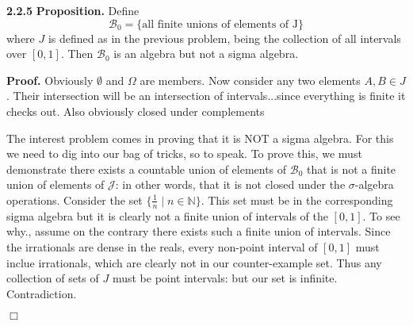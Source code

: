 \documentclass{article}
\begin{document}
\noindent \textbf{2.2.5} \textbf{Proposition.} Define \[\mathcal{B}_0 = \{\text{all finite unions of elements of J}\}\] where $J$ is defined as in the previous problem, being the collection of all intervals over $[0,1]$. Then $\mathcal{B}_0$ is an algebra but not a sigma algebra.

\medskip

\noindent \textbf{Proof.} Obviously $\emptyset$ and $\Omega$ are members. Now consider any two elements $A, B \in J$. Their intersection will be an intersection of intervals...since everything is finite it checks out. Also obviously closed under complements

The interest problem comes in proving that it is NOT a sigma algebra. For this we need to dig into our bag of tricks, so to speak. To prove this, we must demonstrate there exists a countable union of elements of $\mathcal{B}_0$ that is not a finite union of elements of $\mathcal{J}$: in other words, that it is not closed under the $\sigma$-algebra operations. Consider the set $\{ \frac{1}{n} \mid n \in \mathbb{N} \}$. This set must be in the corresponding sigma algebra but it is clearly not a finite union of intervals of the $[0,1]$. To see why., assume on the contrary there exists such a finite union of intervals. Since the irrationals are dense in the reals, every non-point interval of $[0,1]$ must inclue irrationals, which are clearly not in our counter-example set. Thus any collection of sets of $J$ must be point intervals: but our set is infinite. Contradiction.  

\hfill $\Box$
\end{document}
